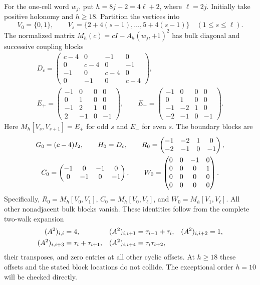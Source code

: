 For the one-cell word $w_j$, put $h=8j+2=4\ell+2$, where $\ell=2j$.
Initially take positive holonomy and $h\ge18$. Partition the vertices into
\[
 V_0=\{0,1\},\qquad
 V_s=\{2+4(s-1),\ldots,5+4(s-1)\}\quad(1\le s\le\ell).
\]
The normalized matrix $M_h(c)=cI-A_h(w_j,+1)^2$ has bulk diagonal and
successive coupling blocks
\begin{gather}
 D_c=\begin{pmatrix}
 c-4&0&-1&0\\0&c-4&0&-1\\-1&0&c-4&0\\0&-1&0&c-4
 \end{pmatrix},\label{eq:D}\\
 E_+=\begin{pmatrix}-1&0&0&0\\0&1&0&0\\-1&2&1&0\\2&-1&0&-1\end{pmatrix},
 \qquad
 E_-=\begin{pmatrix}-1&0&0&0\\0&1&0&0\\-1&-2&1&0\\-2&-1&0&-1\end{pmatrix}.
 \label{eq:E}
\end{gather}
Here $M_h[V_s,V_{s+1}]=E_+$ for odd $s$ and $E_-$ for even $s$.
The boundary blocks are
\begin{gather}
 G_0=(c-4)I_2,\qquad H_0=D_c,\qquad
 R_0=\begin{pmatrix}-1&-2&1&0\\-2&-1&0&-1\end{pmatrix},\notag\\
 C_0=\begin{pmatrix}-1&0&-1&0\\0&-1&0&-1\end{pmatrix},\qquad
 W_0=\begin{pmatrix}0&0&-1&0\\0&0&0&1\\0&0&0&0\\0&0&0&0\end{pmatrix}.
 \label{eq:boundary-data}
\end{gather}
Specifically, $R_0=M_h[V_0,V_1]$, $C_0=M_h[V_0,V_\ell]$, and
$W_0=M_h[V_1,V_\ell]$. All other nonadjacent bulk blocks vanish.
These identities follow from the complete two-walk expansion
\begin{align}
 (A^2)_{i,i}&=4,& (A^2)_{i,i+1}&=\tau_{i-1}+\tau_i,&
 (A^2)_{i,i+2}&=1,\notag\\
 (A^2)_{i,i+3}&=\tau_i+\tau_{i+1},&
 (A^2)_{i,i+4}&=\tau_i\tau_{i+2},&&
 \label{eq:two-walks}
\end{align}
their transposes, and zero entries at all other cyclic offsets. At
$h\ge18$ these offsets and the stated block locations do not collide.
The exceptional order $h=10$ will be checked directly.

